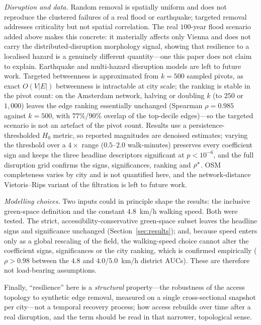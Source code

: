 \emph{Disruption and data.} Random removal is spatially uniform and does not
reproduce the clustered failures of a real flood or earthquake; targeted removal
addresses criticality but not spatial correlation. The real $100$-year flood
scenario added above makes this concrete: it materially affects only Vienna and
does not carry the distributed-disruption morphology signal, showing that resilience
to a localised hazard is a genuinely different quantity---one this paper does not
claim to explain. Earthquake and multi-hazard disruption models are left to future
work.
Targeted betweenness is approximated from $k{=}500$ sampled pivots, as exact
$O(V\lvert E\rvert)$ betweenness is intractable at city scale; the ranking is
stable in the pivot count: on the Amsterdam network, halving or
doubling $k$ (to $250$ or $1{,}000$) leaves the edge ranking essentially unchanged
(Spearman $\rho=0.985$ against $k{=}500$, with $77\%$/$90\%$ overlap of the
top-decile edges)---so the targeted scenario is not an artefact of the pivot
count. Results use a persistence-thresholded $H_0$ metric, so reported magnitudes
are denoised estimates; varying the threshold over a $4\times$ range ($0.5$--$2.0$
walk-minutes) preserves every coefficient sign and keeps the three headline
descriptors significant at $p<10^{-6}$, and the full disruption grid confirms the
signs, significances, ranking and $\rho^{*}$. OSM completeness varies by city and
is not quantified here, and the network-distance Vietoris--Rips variant of the
filtration is left to future work.

\emph{Modelling choices.} Two inputs could in principle shape the results: the
inclusive green-space definition and the constant $4.8$~km/h walking speed. Both were tested. The strict, accessibility-conservative green-space subset leaves the headline
signs and significance unchanged (Section~\ref{sec:results}); and, because speed
enters only as a global rescaling of the field, the walking-speed choice cannot alter
the coefficient signs, significances or the city ranking, which is confirmed
empirically ($\rho>0.98$ between the $4.8$ and $4.0$/$5.0$~km/h district AUCs). These
are therefore not load-bearing assumptions.

Finally, ``resilience'' here is a \emph{structural} property---the robustness of the
access topology to synthetic edge removal, measured on a single cross-sectional
snapshot per city---not a temporal recovery process; how access
rebuilds over time after a real disruption, and the term should be read in that
narrower, topological sense.

